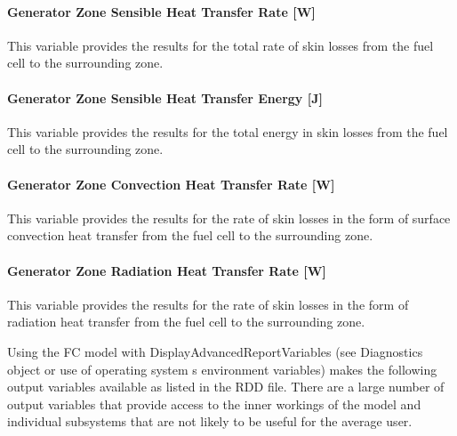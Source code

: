 \paragraph{Generator Zone Sensible Heat Transfer Rate {[}W{]}}\label{generator-zone-sensible-heat-transfer-rate-w-1}

This variable provides the results for the total rate of skin losses from the fuel cell to the surrounding zone.

\paragraph{Generator Zone Sensible Heat Transfer Energy {[}J{]}}\label{generator-zone-sensible-heat-transfer-energy-j-1}

This variable provides the results for the total energy in skin losses from the fuel cell to the surrounding zone.

\paragraph{Generator Zone Convection Heat Transfer Rate {[}W{]}}\label{generator-zone-convection-heat-transfer-rate-w-1}

This variable provides the results for the rate of skin losses in the form of surface convection heat transfer from the fuel cell to the surrounding zone.

\paragraph{Generator Zone Radiation Heat Transfer Rate {[}W{]}}\label{generator-zone-radiation-heat-transfer-rate-w-1}

This variable provides the results for the rate of skin losses in the form of radiation heat transfer from the fuel cell to the surrounding zone.

Using the FC model with DisplayAdvancedReportVariables (see Diagnostics object or use of operating system s environment variables) makes the following output variables available as listed in the RDD file. There are a large number of output variables that provide access to the inner workings of the model and individual subsystems that are not likely to be useful for the average user.


